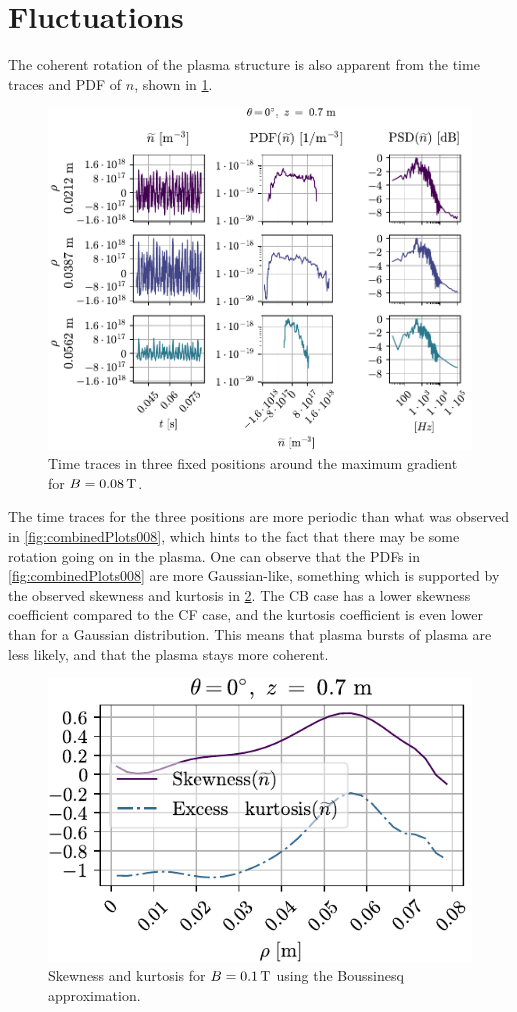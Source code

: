 \section{Fluctuations}
%
The coherent rotation of the plasma structure is also apparent from the time traces and PDF of $n$, shown in \cref{fig:comb008B}.
%
\begin{figure}[htb]
    \centering
    \includegraphics{fig/results/compareBouss/comb008B}
    \caption{Time traces in three fixed positions around the maximum gradient for $B=0.08\, \text{T}$.}
    \label{fig:comb008B}
\end{figure}
%
The time traces for the three positions are more periodic than what was observed in \cref{fig:combinedPlots008}, which hints to the fact that there may be some rotation going on in the plasma.
One can observe that the PDFs in \cref{fig:combinedPlots008} are more Gaussian-like, something which is supported by the observed skewness and kurtosis in \cref{fig:skewKurt008B}.
The CB case has a lower skewness coefficient compared to the CF case, and the kurtosis coefficient is even lower than for a Gaussian distribution.
This means that plasma bursts of plasma are less likely, and that the plasma stays more coherent.
%
\begin{figure}[htb]
    \centering
    \includegraphics{fig/results/compareBouss/skewKurt008B}
    \caption{Skewness and kurtosis for $B=0.1\, \text{T}$ using the Boussinesq approximation.}
    \label{fig:skewKurt008B}
\end{figure}
